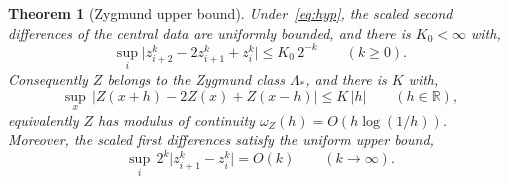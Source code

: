 \documentclass{article}
\theoremstyle{plain}
\newtheorem{theorem}{Theorem}[section]
\theoremstyle{definition}
\newcommand{\R}{\mathbb{R}}
\newcommand{\abs}[1]{\lvert #1 \rvert}
\begin{document}
\begin{theorem}[Zygmund upper bound]\label{thm:zygmund}
Under~\eqref{eq:hyp}, the scaled second differences of the central data are
uniformly bounded, and there is $K_0<\infty$ with,
\begin{equation}\label{eq:seconddiffbound}
  \sup_i\abs{z_{i+2}^k-2z_{i+1}^k+z_i^k}\leq K_0\,2^{-k}\qquad(k\ge0).
\end{equation}
Consequently $Z$ belongs to the Zygmund class $\Lambda_*$, and there is $K$ with,
\begin{equation}\label{eq:zygmund}
  \sup_{x}\,\abs{Z(x+h)-2Z(x)+Z(x-h)}\leq K\,\abs{h}\qquad(h\in\R),
\end{equation}
equivalently $Z$ has modulus of continuity $\omega_Z(h)=O(h\log(1/h))$. Moreover,
the scaled first differences satisfy the uniform upper bound,
\begin{equation}\label{eq:Okupper}
  \sup_i\,2^k\abs{z_{i+1}^k-z_i^k}=O(k)\qquad(k\to\infty).
\end{equation}
\end{theorem}
\end{document}
